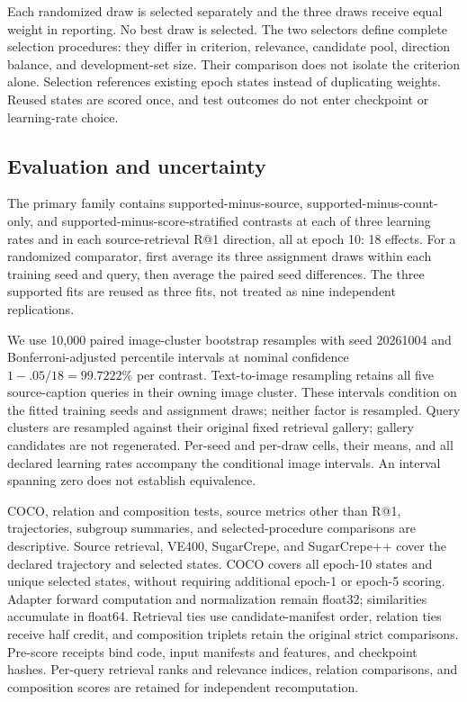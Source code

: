 Each randomized draw is selected separately and the three draws receive equal weight in reporting. No best draw is selected. The two selectors define complete selection procedures: they differ in criterion, relevance, candidate pool, direction balance, and development-set size. Their comparison does not isolate the criterion alone. Selection references existing epoch states instead of duplicating weights. Reused states are scored once, and test outcomes do not enter checkpoint or learning-rate choice.

\subsection{Evaluation and uncertainty}
\label{app:followupuncertainty}
The primary family contains supported-minus-source, supported-minus-count-only, and supported-minus-score-stratified contrasts at each of three learning rates and in each source-retrieval R@1 direction, all at epoch 10: 18 effects. For a randomized comparator, first average its three assignment draws within each training seed and query, then average the paired seed differences. The three supported fits are reused as three fits, not treated as nine independent replications.

We use 10,000 paired image-cluster bootstrap resamples with seed 20261004 and Bonferroni-adjusted percentile intervals at nominal confidence $1-.05/18=99.7222\%$ per contrast. Text-to-image resampling retains all five source-caption queries in their owning image cluster. These intervals condition on the fitted training seeds and assignment draws; neither factor is resampled. Query clusters are resampled against their original fixed retrieval gallery; gallery candidates are not regenerated. Per-seed and per-draw cells, their means, and all declared learning rates accompany the conditional image intervals. An interval spanning zero does not establish equivalence.

COCO, relation and composition tests, source metrics other than R@1, trajectories, subgroup summaries, and selected-procedure comparisons are descriptive. Source retrieval, VE400, SugarCrepe, and SugarCrepe++ cover the declared trajectory and selected states. COCO covers all epoch-10 states and unique selected states, without requiring additional epoch-1 or epoch-5 scoring. Adapter forward computation and normalization remain float32; similarities accumulate in float64. Retrieval ties use candidate-manifest order, relation ties receive half credit, and composition triplets retain the original strict comparisons. Pre-score receipts bind code, input manifests and features, and checkpoint hashes. Per-query retrieval ranks and relevance indices, relation comparisons, and composition scores are retained for independent recomputation.

